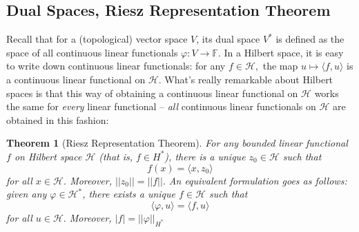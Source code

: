 \documentclass[psamsfonts]{amsart}
\newtheorem{thm}{Theorem}[section]
\theoremstyle{definition}
\theoremstyle{remark}
\numberwithin{equation}{section}
\begin{document}
\subsection{Dual Spaces, Riesz Representation Theorem}
Recall that for a (topological) vector space $V$, its dual space $V^*$ is defined as the space of all continuous linear functionals $\varphi : V \rightarrow \mathbb{F}.$ In a Hilbert space, it is easy to write down continuous linear functionals: for any $f \in \mathcal{H},$ the map $u \mapsto \langle f, u \rangle $ is a continuous linear functional on $\mathcal{H}$. What's really remarkable about Hilbert spaces is that this way of obtaining a continuous linear functional on $\mathcal{H}$ works the same for \textit{every} linear functional -- \textit{all} continuous linear functionals on $\mathcal{H}$ are obtained in this fashion: 
\begin{thm}[Riesz Representation Theorem]
For any bounded linear functional $f$ on Hilbert space $\mathcal{H}$ (that is, $f \in H^*$), there is a unique $z_0 \in \mathcal{H}$ such that 
$$f(x) = \langle x, z_0 \rangle $$
for all $x \in \mathcal{H}$. Moreover, $||z_0|| = ||f||.$ An equivalent formulation goes as follows: given any $\varphi \in \mathcal{H}^*$, there exists a unique $f \in \mathcal{H}$ such that 
$$\langle \varphi, u \rangle = \langle f, u \rangle $$
for all $u \in \mathcal{H}.$ Moreover, $|f| = ||\varphi|| _{H^*}$
\end{thm}
\end{document}
